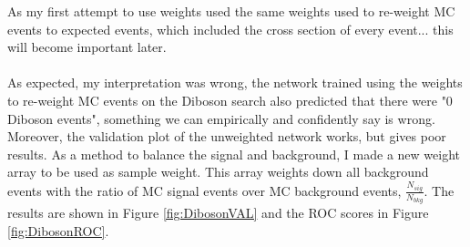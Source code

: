 \documentclass[14pt, a4paper]{book}
\begin{document}
As my first attempt to use weights used the same weights used to re-weight MC events to expected events, which included the cross section of every event... this will become important later.\\
\\As expected, my interpretation was wrong, the network trained using the weights to re-weight MC events on the Diboson search also predicted that there were "0 Diboson events", something we can empirically and confidently say is wrong. 
Moreover, the validation plot of the unweighted network works, but gives poor results. As a method to balance the signal and background, I made a new weight array to be used as sample weight. This array weights down all background events 
with the ratio of MC signal events over MC background events, $\frac{N_{sig}}{N_{bkg}}$. The results are shown in Figure \ref{fig:DibosonVAL} and the ROC scores in Figure \ref{fig:DibosonROC}.\\
\end{document}
